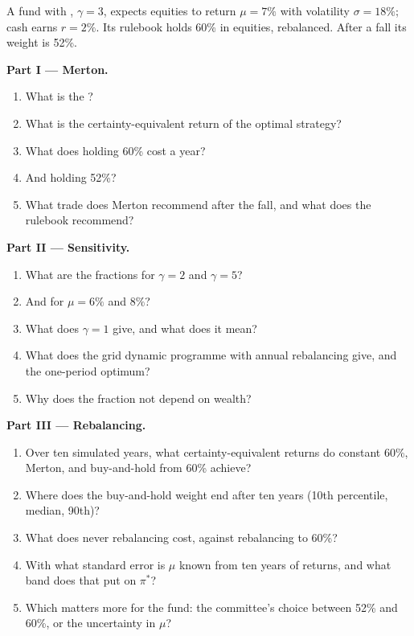 \begin{problem}\label{pb:qm:stochastic-control:1}
A fund with , $\gamma = 3$, expects equities to return $\mu = 7\%$ with volatility $\sigma = 18\%$; cash earns $r =
2\%$. Its rulebook holds 60\% in equities, rebalanced. After a fall its weight is 52\%.

\medskip\noindent\textbf{Part I --- Merton.}
\begin{enumerate}
\item What is the ?
\item What is the certainty-equivalent return of the optimal strategy?
\item What does holding 60\% cost a year?
\item And holding 52\%?
\item What trade does Merton recommend after the fall, and what does the rulebook recommend?
\end{enumerate}

\medskip\noindent\textbf{Part II --- Sensitivity.}
\begin{enumerate}[resume]
\item What are the fractions for $\gamma = 2$ and $\gamma = 5$?
\item And for $\mu = 6\%$ and $8\%$?
\item What does $\gamma = 1$ give, and what does it mean?
\item What does the grid dynamic programme with annual rebalancing give, and the one-period optimum?
\item Why does the fraction not depend on wealth?
\end{enumerate}

\medskip\noindent\textbf{Part III --- Rebalancing.}
\begin{enumerate}[resume]
\item Over ten simulated years, what certainty-equivalent returns do constant 60\%, Merton, and buy-and-hold from 60\% achieve?
\item Where does the buy-and-hold weight end after ten years (10th percentile, median, 90th)?
\item What does never rebalancing cost, against rebalancing to 60\%?
\item With what standard error is $\mu$ known from ten years of returns, and what band does that put on $\pi^*$?
\item Which matters more for the fund: the committee's choice between 52\% and 60\%, or the uncertainty in $\mu$?
\end{enumerate}


\end{problem}
